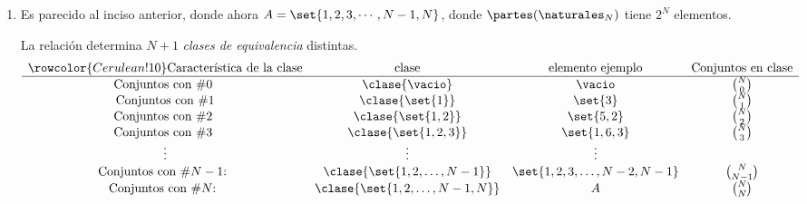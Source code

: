 \begin{enumerate}[label=\roman*)]
  \item
        Es parecido al inciso anterior, donde ahora $A = \set{1,2,3, \cdots, N-1, N}$, donde $\partes(\naturales_N)$ tiene $2^N$ elementos.\par
        La relación determina $N+1$ \textit{clases de equivalencia} distintas.
        $$
          \begin{array}{cccc}
            \rowcolor{Cerulean!10}
            \text{Característica de la clase} & \text{clase}                   & \text{elemento ejemplo}      & \text{Conjuntos en clase} \\ \hline
            \text{Conjuntos con \#0 }         & \clase{\vacio}                 & \vacio                       & \binom{N}{0}              \\
            \text{Conjuntos con \#1}          & \clase{\set{1}}                & \set{3}                      & \binom{N}{1}              \\
            \text{Conjuntos con \#2 }         & \clase{\set{1,2}}              & \set{5,2}                    & \binom{N}{2}              \\
            \text{Conjuntos con \#3 }         & \clase{\set{1,2,3}}            & \set{1,6, 3}                 & \binom{N}{3}              \\
            \vdots                            & \vdots                         & \vdots                       &                           \\
            \text{Conjuntos con \#$N-1$: }    & \clase{\set{1,2,\ldots,N-1}}   & \set{1,2,3, \ldots,N-2, N-1} & \binom{N}{N-1}            \\
            \text{Conjuntos con \#$N$: }      & \clase{\set{1,2,\ldots,N-1,N}} & A                            & \binom{N}{N}              \\
          \end{array}
        $$
\end{enumerate}

\begin{aportes}
  \item {}
  \item {}
\end{aportes}
